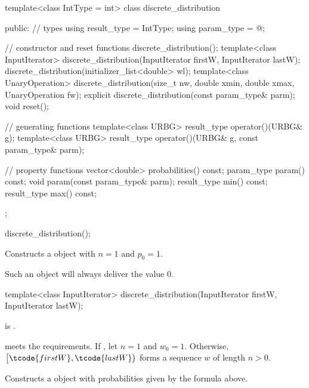 %
%
\begin{codeblock}
template<class IntType = int>
  class discrete_distribution {
  public:
    // types
    using result_type = IntType;
    using param_type  = @\unspec@;

    // constructor and reset functions
    discrete_distribution();
    template<class InputIterator>
      discrete_distribution(InputIterator firstW, InputIterator lastW);
    discrete_distribution(initializer_list<double> wl);
    template<class UnaryOperation>
      discrete_distribution(size_t nw, double xmin, double xmax, UnaryOperation fw);
    explicit discrete_distribution(const param_type& parm);
    void reset();

    // generating functions
    template<class URBG>
      result_type operator()(URBG& g);
    template<class URBG>
      result_type operator()(URBG& g, const param_type& parm);

    // property functions
    vector<double> probabilities() const;
    param_type param() const;
    void param(const param_type& parm);
    result_type min() const;
    result_type max() const;
  };
\end{codeblock}

\begin{indexed}{}
\begin{itemdecl}
discrete_distribution();
\end{itemdecl}
\end{indexed}

\begin{itemdescr}
\pnum
\effects
Constructs a  object
with $n = 1$ and $p_0 = 1$.
\begin{note}
Such an object will always deliver the value $0$.
\end{note}
\end{itemdescr}


%
\begin{itemdecl}
template<class InputIterator>
  discrete_distribution(InputIterator firstW, InputIterator lastW);
\end{itemdecl}

\begin{itemdescr}
\pnum
\mandates
{} is .

\pnum
\expects
   meets the
   requirements.
 If ,
 let $n = 1$ and $w_0 = 1$.
 Otherwise,
 $\bigl[\tcode{firstW}, \tcode{lastW}\bigr)$
 forms a sequence $w$ of length $n > 0$.

\pnum
\effects
Constructs a  object
with probabilities given by the formula above.
\end{itemdescr}


